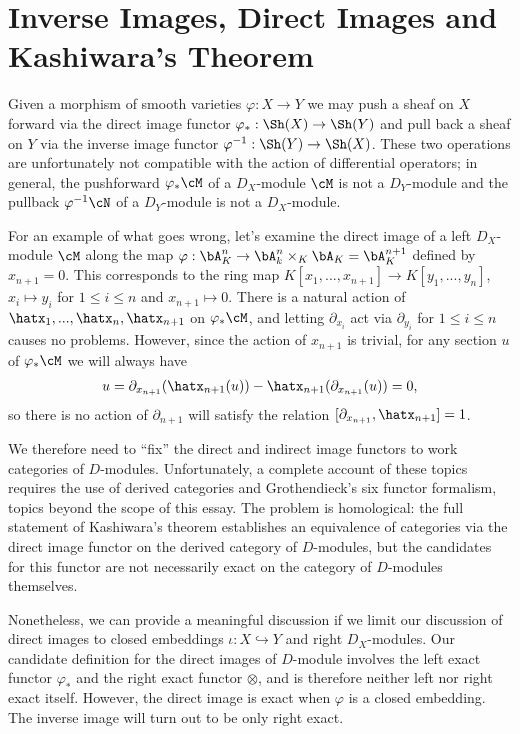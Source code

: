 \newpage

\section{Inverse Images, Direct Images and Kashiwara's Theorem}
Given a morphism of smooth varieties $\varphi:X\to Y$ we may push a sheaf on $X$ forward via the direct image functor $\varphi_*:\Sh(X)\to \Sh(Y)$ and pull back a sheaf on $Y$ via the inverse image functor $\varphi^{-1}:\Sh(Y) \to \Sh(X)$. These two operations are unfortunately not compatible with the action of differential operators; in general, the pushforward $\varphi_*\cM$ of a $D_X$-module $\cM$ is not a $D_Y$-module and the pullback $\varphi^{-1}\cN$ of a $D_Y$-module is not a $D_X$-module. 

\begin{example}\label{example:pushforward-naive-breaks}
	For an example of what goes wrong, let's examine the direct image of a left $D_X$-module $\cM$ along the map $\varphi:\bA^{n}_K\to \bA^{n}_k\times_K \bA_K = \bA^{n+1}_K$ defined by $x_{n+1} = 0$. This corresponds to the ring map $K[x_1,...,x_{n+1}]\to K[y_1,...,y_n]$, $x_i \mapsto y_i$ for $1\leq i\leq n$ and $x_{n+1}\mapsto 0$. There is a natural action of $\hatx_1,...,\hatx_n,\hatx_{n+1}$ on $\varphi_*\cM$, and letting $\partial_{x_i}$ act via $\partial_{y_i}$ for $1\leq i\leq n$ causes no problems. However, since the action of $x_{n+1}$ is trivial, for any section $u$ of $\varphi_*\cM$ we will always have
	\begin{align*}
		[\partial_{x_{n+1}},\hatx_{n+1}]u = \partial_{x_{n+1}}(\hatx_{n+1}(u)) - \hatx_{n+1}(\partial_{x_{n+1}}(u)) = 0,
	\end{align*}
	so there is no action of $\partial_{n+1}$ will satisfy the relation $[\partial_{x_{n+1}},\hatx_{n+1}] = 1$. 
\end{example}
We therefore need to ``fix'' the direct and indirect image functors to work categories of $D$-modules. Unfortunately, a complete account of these topics requires the use of derived categories and Grothendieck's six functor formalism, topics beyond the scope of this essay. The problem is homological: the full statement of Kashiwara's theorem establishes an equivalence of categories via the direct image functor on the derived category of $D$-modules, but the candidates for this functor are not necessarily exact on the category of $D$-modules themselves.

Nonetheless, we can provide a meaningful discussion if we limit our discussion of direct images to closed embeddings $\iota:X\hookrightarrow Y$ and right $D_X$-modules. Our candidate definition for the direct images of $D$-module involves the left exact functor $\varphi_*$ and the right exact functor $\otimes$, and is therefore neither left nor right exact itself. However, the direct image is exact when $\varphi$ is a closed embedding. The inverse image will turn out to be only right exact.

